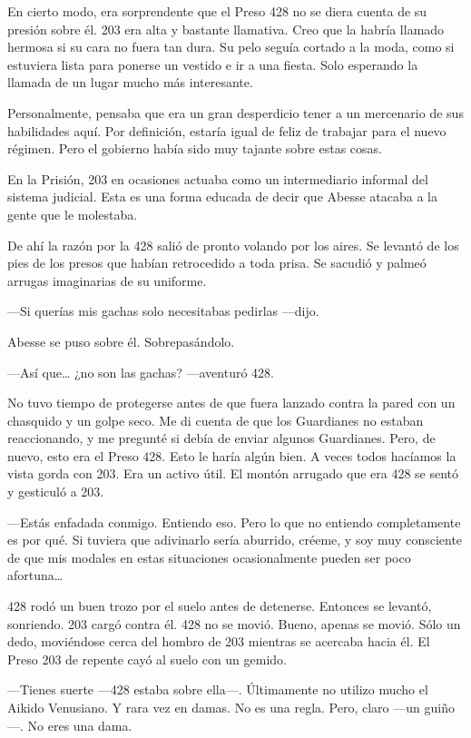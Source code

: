 En cierto modo, era sorprendente que el Preso 428 no se diera cuenta de
su presión sobre él. 203 era alta y bastante llamativa. Creo que la
habría llamado hermosa si su cara no fuera tan dura. Su pelo seguía
cortado a la moda, como si estuviera lista para ponerse un vestido e ir
a una fiesta. Solo esperando la llamada de un lugar mucho más
interesante.

Personalmente, pensaba que era un gran desperdicio tener a un mercenario
de sus habilidades aquí. Por definición, estaría igual de feliz de
trabajar para el nuevo régimen. Pero el gobierno había sido muy tajante
sobre estas cosas.

En la Prisión, 203 en ocasiones actuaba como un intermediario informal
del sistema judicial. Esta es una forma educada de decir que Abesse
atacaba a la gente que le molestaba.

De ahí la razón por la 428 salió de pronto volando por los aires. Se
levantó de los pies de los presos que habían retrocedido a toda prisa.
Se sacudió y palmeó arrugas imaginarias de su uniforme.

---Si querías mis gachas solo necesitabas pedirlas ---dijo.

Abesse se puso sobre él. Sobrepasándolo.

---Así que\ldots{} ¿no son las gachas? ---aventuró 428.

No tuvo tiempo de protegerse antes de que fuera lanzado contra la pared
con un chasquido y un golpe seco. Me di cuenta de que los Guardianes no
estaban reaccionando, y me pregunté si debía de enviar algunos
Guardianes. Pero, de nuevo, esto era el Preso 428. Esto le haría algún
bien. A veces todos hacíamos la vista gorda con 203. Era un activo útil.
El montón arrugado que era 428 se sentó y gesticuló a 203.

---Estás enfadada conmigo. Entiendo eso. Pero lo que no entiendo
completamente es por qué. Si tuviera que adivinarlo sería aburrido,
créeme, y soy muy consciente de que mis modales en estas situaciones
ocasionalmente pueden ser poco afortuna\ldots{}

428 rodó un buen trozo por el suelo antes de detenerse. Entonces se
levantó, sonriendo. 203 cargó contra él. 428 no se movió. Bueno, apenas
se movió. Sólo un dedo, moviéndose cerca del hombro de 203 mientras se
acercaba hacia él. El Preso 203 de repente cayó al suelo con un gemido.

---Tienes suerte ---428 estaba sobre ella---. Últimamente no utilizo
mucho el Aikido Venusiano. Y rara vez en damas. No es una regla. Pero,
claro ---un guiño---. No eres una dama.


